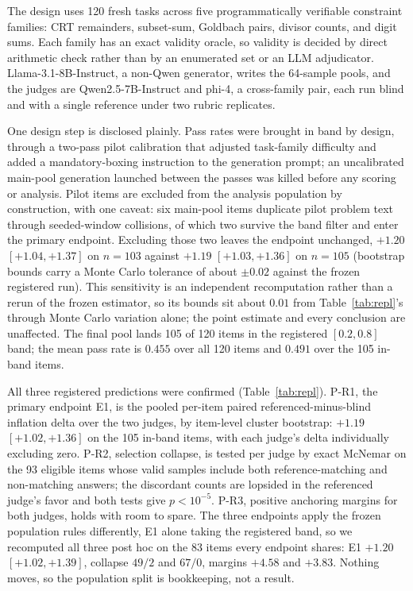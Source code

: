 \documentclass[11pt]{article}
\begin{document}
The design uses 120 fresh tasks across five programmatically verifiable constraint families: CRT remainders, subset-sum, Goldbach pairs, divisor counts, and digit sums.
Each family has an exact validity oracle, so validity is decided by direct arithmetic check rather than by an enumerated set or an LLM adjudicator.
Llama-3.1-8B-Instruct, a non-Qwen generator, writes the 64-sample pools, and the judges are Qwen2.5-7B-Instruct and phi-4, a cross-family pair, each run blind and with a single reference under two rubric replicates.

One design step is disclosed plainly.
Pass rates were brought in band by design, through a two-pass pilot calibration that adjusted task-family difficulty and added a mandatory-boxing instruction to the generation prompt; an uncalibrated main-pool generation launched between the passes was killed before any scoring or analysis.
Pilot items are excluded from the analysis population by construction, with one caveat: six main-pool items duplicate pilot problem text through seeded-window collisions, of which two survive the band filter and enter the primary endpoint.
Excluding those two leaves the endpoint unchanged, $+1.20$ $[+1.04, +1.37]$ on $n{=}103$ against $+1.19$ $[+1.03, +1.36]$ on $n{=}105$ (bootstrap bounds carry a Monte Carlo tolerance of about $\pm 0.02$ against the frozen registered run).
This sensitivity is an independent recomputation rather than a rerun of the frozen estimator, so its bounds sit about $0.01$ from Table~\ref{tab:repl}'s through Monte Carlo variation alone; the point estimate and every conclusion are unaffected.
The final pool lands 105 of 120 items in the registered $[0.2, 0.8]$ band; the mean pass rate is $0.455$ over all 120 items and $0.491$ over the 105 in-band items.

All three registered predictions were confirmed (Table~\ref{tab:repl}).
P-R1, the primary endpoint E1, is the pooled per-item paired referenced-minus-blind inflation delta over the two judges, by item-level cluster bootstrap: $+1.19$ $[+1.02, +1.36]$ on the 105 in-band items, with each judge's delta individually excluding zero.
P-R2, selection collapse, is tested per judge by exact McNemar on the 93 eligible items whose valid samples include both reference-matching and non-matching answers; the discordant counts are lopsided in the referenced judge's favor and both tests give $p < 10^{-5}$.
P-R3, positive anchoring margins for both judges, holds with room to spare.
The three endpoints apply the frozen population rules differently, E1 alone taking the registered band, so we recomputed all three post hoc on the 83 items every endpoint shares: E1 $+1.20$ $[+1.02, +1.39]$, collapse $49/2$ and $67/0$, margins $+4.58$ and $+3.83$.
Nothing moves, so the population split is bookkeeping, not a result.
\end{document}
